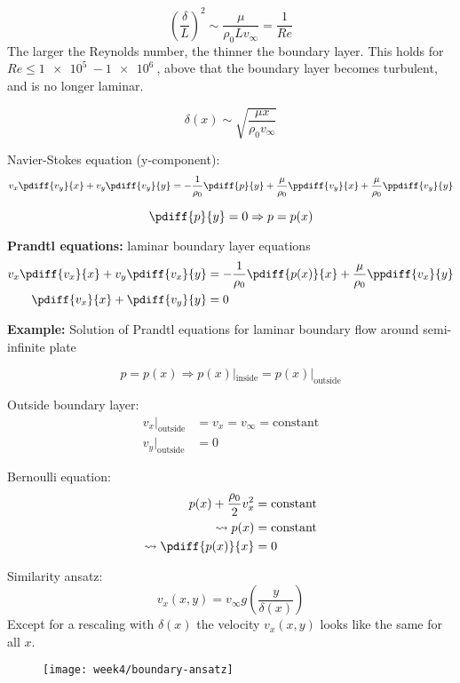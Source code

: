 \begin{equation}
\left(\frac{\delta}{L}\right)^2 \sim \frac{\mu}{\rho_0 L v_\infty} = \frac{1}{Re}
\end{equation}
The larger the Reynolds number, the thinner the boundary layer. This holds for $Re \leq \SI{1e5}{}-\SI{1e6}{}$, above that the boundary layer becomes turbulent, and is no longer laminar. 

\begin{equation}
\delta(x) \sim \sqrt{\frac{\mu x}{\rho_0 v_\infty}}
\end{equation}


Navier-Stokes equation (y-component):
\begin{equation}
v_x\pdiff{v_y}{x} + v_y\pdiff{v_y}{y} = -\frac{1}{\rho_0}\pdiff{p}{y} + \frac{\mu}{\rho_0}\ppdiff{v_y}{x} + \frac{\mu}{\rho_0}\ppdiff{v_y}{y}
\end{equation}

\begin{equation}
\pdiff{p}{y} = 0 \Rightarrow p = p(x)
\end{equation}


\textbf{Prandtl equations:} laminar boundary layer equations
\begin{align}
v_x\pdiff{v_x}{x}+v_y\pdiff{v_x}{y} &= -\frac{1}{\rho_0}\pdiff{p(x)}{x}+\frac{\mu}{\rho_0}\ppdiff{v_x}{y} \\
\pdiff{v_x}{x}+\pdiff{v_y}{y}&=0
\end{align}

\textbf{Example:} Solution of Prandtl equations for laminar boundary flow around semi-infinite plate

\begin{equation}
p=p(x) \Rightarrow p(x)|_\mathrm{inside} = p(x)|_\mathrm{outside}
\end{equation}

Outside boundary layer:
\begin{align}
v_x|_\mathrm{outside} &= v_x = v_\infty = \mathrm{constant} \\
v_y|_\mathrm{outside} &= 0
\end{align}

Bernoulli equation:
\begin{align}
p(x) + \frac{\rho_0}{2}v_x^2 &= \mathrm{constant}\\
\leadsto
p(x) &= \mathrm{constant} \\
\leadsto
\pdiff{p(x)}{x} &= 0
\end{align}

Similarity ansatz:
\begin{equation}
v_x(x,y) = v_\infty g\left(\frac{y}{\delta(x)}\right)
\end{equation}
Except for a rescaling with $\delta(x)$ the velocity $v_x(x,y)$ looks like the same for all $x$.
\begin{figure}[ht]
    \centering
    \texttt{[image: week4/boundary-ansatz]}\\
    \caption{}
    \label{fig:boundary-ansatz}
\end{figure}



